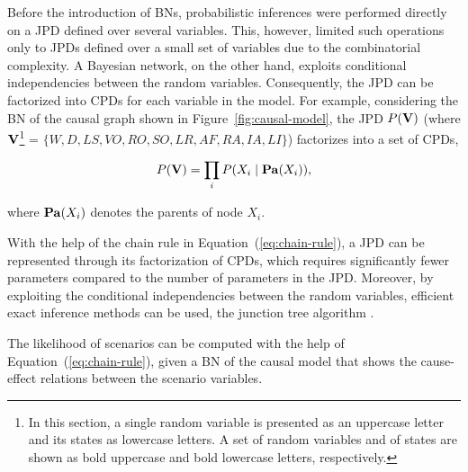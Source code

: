 \documentclass[conference]{IEEEtran}
\begin{document}
Before the introduction of BNs, probabilistic inferences were performed directly on a JPD defined over several variables. This, however, limited such operations only to JPDs defined over a small set of variables due to the combinatorial complexity. A Bayesian network, on the other hand, exploits conditional independencies between the random variables. Consequently, the JPD can be factorized into CPDs for each variable in the model. 
For example, considering the BN of the causal graph shown in Figure~\ref{fig:causal-model}, the JPD $P({\mathbf{V}})$ (where ${\mathbf{V}}$\footnote{In this section, a single random variable is presented as an uppercase letter and its states as lowercase letters. A set of random variables and of states are shown as bold uppercase and bold lowercase letters, respectively.} = $\{W, D, LS, VO, RO, SO, LR, AF, RA, IA, LI\}$) factorizes into a set of CPDs, \ie


\begin{eqnarray}
P(\VV) = \prod_i P(X_i\mid \Pa(X_i)),  \label{eq:chain-rule}
\end{eqnarray}

\noindent
where ${\mathbf{Pa}}(X_i)$ denotes the parents of node $X_i$. 

% 


With the help of the chain rule in Equation~(\ref{eq:chain-rule}), a JPD can be represented through its factorization of CPDs, which requires significantly fewer parameters compared to the number of parameters in the JPD. Moreover, by exploiting the conditional independencies between the random variables, efficient exact inference methods can be used, \eg the junction tree algorithm \cite{cowell99bn}.

The likelihood of scenarios can be computed with the help of Equation~(\ref{eq:chain-rule}), given a BN of the causal model that shows the cause-effect relations between the scenario variables. 


\end{document}
